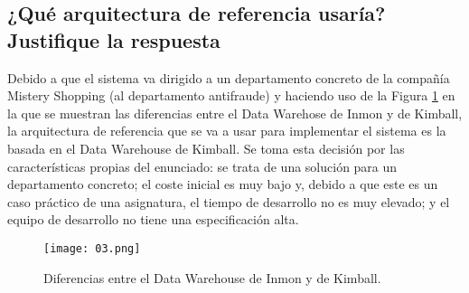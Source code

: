 \medskip
\subsection{¿Qué arquitectura de referencia usaría? Justifique la respuesta}
Debido a que el sistema va dirigido a un departamento concreto de la compañía Mistery Shopping (al departamento antifraude) y haciendo uso de la Figura \ref{03-image} en la que se muestran las diferencias entre el Data Warehose de Inmon y de Kimball, la arquitectura de referencia que se va a usar para implementar el sistema es la basada en el Data Warehouse de Kimball. Se toma esta decisión por las características propias del enunciado: se trata de una solución para un departamento concreto; el coste inicial es muy bajo y, debido a que este es un caso práctico de una asignatura, el tiempo de desarrollo no es muy elevado; y el equipo de desarrollo no tiene una especificación alta.
\begin{figure}[!th]
\texttt{[image: 03.png]}
\centering
\caption{Diferencias entre el Data Warehouse de Inmon y de Kimball.}
\label{03-image}
\end{figure}
